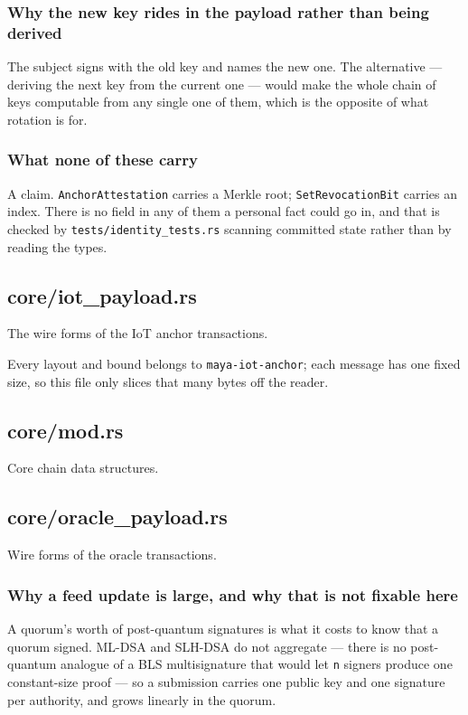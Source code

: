 \documentclass[11pt,a4paper]{article}
\begin{document}
\subsubsection{Why the new key rides in the payload rather than being derived}

The subject signs with the old key and names the new one. The alternative —
deriving the next key from the current one — would make the whole chain of
keys computable from any single one of them, which is the opposite of what
rotation is for.

\subsubsection{What none of these carry}

A claim. \texttt{AnchorAttestation} carries a Merkle root; \texttt{SetRevocationBit}
carries an index. There is no field in any of them a personal fact could go
in, and that is checked by \texttt{tests/identity\_tests.rs} scanning committed
state rather than by reading the types.

\subsection{core/iot\_payload.rs}
The wire forms of the IoT anchor transactions.

Every layout and bound belongs to \texttt{maya-iot-anchor}; each message has one
fixed size, so this file only slices that many bytes off the reader.

\subsection{core/mod.rs}
Core chain data structures.

\subsection{core/oracle\_payload.rs}
Wire forms of the oracle transactions.

\subsubsection{Why a feed update is large, and why that is not fixable here}

A quorum's worth of post-quantum signatures is what it costs to know that a
quorum signed. ML-DSA and SLH-DSA do not aggregate — there is no post-
quantum analogue of a BLS multisignature that would let \texttt{n} signers produce
one constant-size proof — so a submission carries one public key and one
signature per authority, and grows linearly in the quorum.
\end{document}
